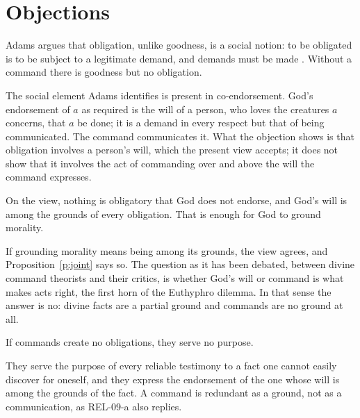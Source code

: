 \documentclass{situationist-preprint}
\begin{document}
\section{Objections}

\begin{objection}
Adams argues that obligation, unlike goodness, is a social notion: to be obligated is to be subject to a legitimate demand, and demands must be made \citep{Adams1999}. Without a command there is goodness but no obligation.
\end{objection}

\begin{reply}
The social element Adams identifies is present in co-endorsement. God's endorsement of $a$ as required is the will of a person, who loves the creatures $a$ concerns, that $a$ be done; it is a demand in every respect but that of being communicated. The command communicates it. What the objection shows is that obligation involves a person's will, which the present view accepts; it does not show that it involves the act of commanding over and above the will the command expresses.
\end{reply}

\begin{objection}
On the view, nothing is obligatory that God does not endorse, and God's will is among the grounds of every obligation. That is enough for God to ground morality.
\end{objection}

\begin{reply}
If grounding morality means being among its grounds, the view agrees, and Proposition~\ref{p:joint} says so. The question as it has been debated, between divine command theorists and their critics, is whether God's will or command is what makes acts right, the first horn of the Euthyphro dilemma. In that sense the answer is no: divine facts are a partial ground and commands are no ground at all.
\end{reply}

\begin{objection}
If commands create no obligations, they serve no purpose.
\end{objection}

\begin{reply}
They serve the purpose of every reliable testimony to a fact one cannot easily discover for oneself, and they express the endorsement of the one whose will is among the grounds of the fact. A command is redundant as a ground, not as a communication, as REL-09-a also replies.
\end{reply}
\end{document}
